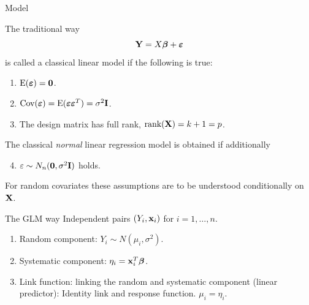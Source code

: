 \documentclass[
  ignorenonframetext,
]{beamer}
\providecommand{\tightlist}{%
  \setlength{\itemsep}{0pt}\setlength{\parskip}{0pt}}
\begin{document}
\begin{frame}{Model}
\protect{}\label{model}
\begin{block}{The traditional way}
\protect{}\label{the-traditional-way}
\[{\bf Y}=X \boldsymbol{\beta}+\boldsymbol{\varepsilon}\] is called a
classical linear model if the following is true:

\begin{enumerate}
\item
  \(\text{E}(\boldsymbol{\varepsilon})=\bf{0}\).
\item
  \(\text{Cov}(\boldsymbol{\varepsilon})=\text{E}(\boldsymbol{\varepsilon}\boldsymbol{\varepsilon}^T)=\sigma^2\bf{I}\).
\item
  The design matrix has full rank, \(\text{rank}({\bf X})=k+1=p\).
\end{enumerate}

The classical \emph{normal} linear regression model is obtained if
additionally

\begin{enumerate}
\setcounter{enumi}{3}
\tightlist
\item
  \(\varepsilon\sim N_n({\bf{0}}, \sigma^2 \bf{I})\) holds.
\end{enumerate}

For random covariates these assumptions are to be understood
conditionally on \(\bf{X}\).
\end{block}
\end{frame}

\begin{frame}
\begin{block}{The GLM way}
\protect{}\label{the-glm-way}
Independent pairs \((Y_i, {\bf x}_i)\) for \(i=1,\ldots,n\).

\begin{enumerate}
\tightlist
\item
  Random component: \(Y_i \sim N(\mu_i, \sigma^2)\).
\item
  Systematic component: \(\eta_i={\bf x}_i^T \boldsymbol{\beta}\).
\item
  Link function: linking the random and systematic component (linear
  predictor): Identity link and response function. \(\mu_i=\eta_i\).
\end{enumerate}
\end{block}
\end{frame}
\end{document}
